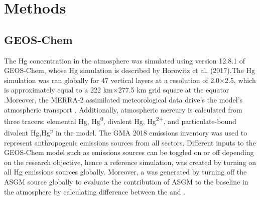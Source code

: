 \section{Methods}
\subsection{GEOS-Chem}
\begin{flushleft}

The Hg concentration in the atmosphere was simulated using version 12.8.1 of GEOS-Chem, whose Hg simulation is described by Horowitz et al. (2017)\cite{horowitz_new_2017}.The Hg simulation was ran globally for 47 vertical layers at a resolution of 2.0$\times$2.5, which is approximately equal to a 222 km$\times$277.5 km grid square at the equator \cite{horowitz_new_2017}.Moreover, the MERRA-2 assimilated meteorological data drive's the model's atmospheric transport \cite{gelaro_modern-era_2017}. Additionally, atmospheric mercury is calculated from three tracers: elemental Hg, Hg\textsuperscript{0}, divalent Hg, Hg\textsuperscript{2+}, and particulate-bound divalent Hg,Hg\textsuperscript{p} in the model. The GMA 2018 emissions inventory was used to represent anthropogenic emissions sources from all sectors\cite{steenhuisen_development_2019}. Different inputs to the GEOS-Chem model such as emissions sources can be toggled on or off depending on the research objective, hence a reference simulation, \on was created by turning on all Hg emissions sources globally. Moreover, a \off was generated by turning off the ASGM source globally to evaluate the contribution of ASGM to the baseline \hg in the atmosphere by calculating difference between the \on and \off.
\end{flushleft}

